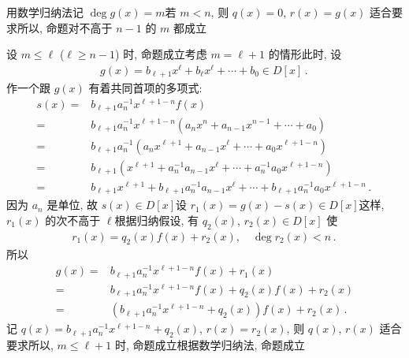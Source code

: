 \begin{pf}
    用数学归纳法\period 记 $\deg g(x) = m$\period 若 $m<n$, 则 $q(x) = 0$, $r(x) = g(x)$ 适合要求\period 所以, 命题对不高于 $n-1$ 的 $m$ 都成立\period

    设 $m \leq \ell$ ($\ell \geq n-1$) 时, 命题成立\period 考虑 $m=\ell+1$ 的情形\period 此时, 设
    \begin{align*}
        g(x) = b_{\ell + 1} x^{\ell} + b_{\ell} x^{\ell} + \cdots + b_0 \in D[x] \period
    \end{align*}
    作一个跟 $g(x)$ 有着共同首项的多项式:
    \begin{align*}
        s(x) = {} & b_{\ell + 1} a_n^{-1} x^{\ell + 1 - n} f(x)                                                                                      \\
        = {}      & b_{\ell + 1} a_n^{-1} x^{\ell + 1 - n} (a_n x^n + a_{n-1} x^{n-1} + \cdots + a_0)                                                \\
        = {}      & b_{\ell + 1} a_n^{-1} (a_n x^{\ell + 1} + a_{n-1} x^{\ell} + \cdots + a_0 x^{\ell + 1 - n})                                      \\
        = {}      & b_{\ell + 1} (x^{\ell + 1} + a_n^{-1} a_{n-1} x^{\ell} + \cdots + a_n^{-1} a_0 x^{\ell + 1 - n})                                 \\
        = {}      & b_{\ell + 1} x^{\ell + 1} + b_{\ell + 1} a_n^{-1} a_{n-1} x^{\ell} + \cdots + b_{\ell + 1} a_n^{-1} a_0 x^{\ell + 1 - n} \period
    \end{align*}
    因为 $a_n$ 是单位, 故 $s(x) \in D[x]$\period 设 $r_1 (x) = g(x) - s(x) \in D[x]$\period 这样, $r_1 (x)$ 的次不高于 $\ell$\period 根据归纳假设, 有 $q_2 (x)$, $r_2(x) \in D[x]$ 使
    \begin{align*}
        r_1 (x) = q_2 (x) f(x) + r_2 (x), \quad \deg r_2 (x) < n \period
    \end{align*}
    所以
    \begin{align*}
        g(x)
        = {} & b_{\ell+1} a_n^{-1} x^{\ell+1-n} f(x) + r_1 (x)                     \\
        = {} & b_{\ell+1} a_n^{-1} x^{\ell+1-n} f(x) + q_2 (x) f(x) + r_2 (x)      \\
        = {} & (b_{\ell+1} a_n^{-1} x^{\ell+1-n} + q_2 (x)) f(x) + r_2 (x) \period
    \end{align*}
    记 $q(x) = b_{\ell+1} a_n^{-1} x^{\ell+1-n} + q_2 (x)$, $r(x) = r_2 (x)$, 则 $q(x)$, $r(x)$ 适合要求\period 所以, $m \leq \ell + 1$ 时, 命题成立\period 根据数学归纳法, 命题成立\period
\end{pf}

